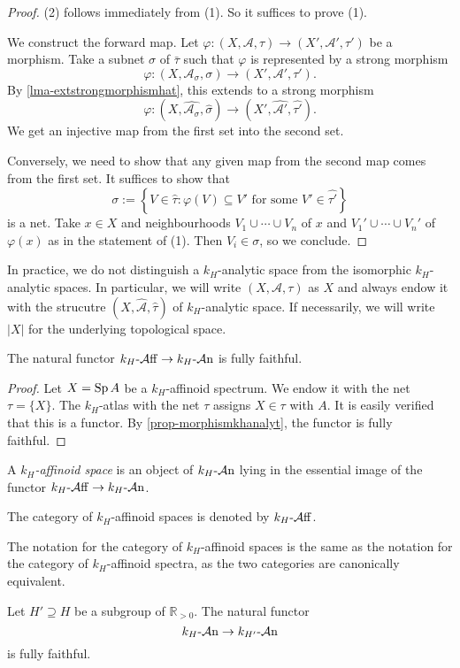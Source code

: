 \begin{proof}
    (2) follows immediately from (1). So it suffices to prove (1).

    We construct the forward map. Let $\varphi:(X,\mathcal{A},\tau)\rightarrow (X',\mathcal{A}',\tau')$ be a morphism. Take a subnet $\sigma$ of $\bar{\tau}$ such that $\varphi$ is represented by a strong morphism
    \[
        \varphi:(X,\mathcal{A}_{\sigma},\sigma)\rightarrow (X',\mathcal{A}',\tau').
    \]  
    By \cref{lma-extstrongmorphismhat}, this extends to a strong morphism
    \[
        \varphi:(X,\widehat{\mathcal{A}_{\sigma}},\hat{\sigma})\rightarrow (X',\widehat{\mathcal{A}'},\widehat{\tau'}).
    \] 
    We get an injective map from the first set into the second set.

    Conversely, we need to show that any given map from the second map comes from the first set. It suffices to show that
    \[
        \sigma:=\left\{ V\in \hat{\tau} : \varphi(V)\subseteq V'\text{ for some } V'\in \widehat{\tau'} \right\}
    \]
    is a net. Take $x\in X$ and neighbourhoods $V_1\cup\cdots\cup V_n$ of $x$ and $V_1'\cup\cdots\cup V_n'$ of $\varphi(x)$ as in the statement of (1). Then $V_i\in \sigma$, so we conclude. 
\end{proof}

In practice, we do not distinguish a $k_H$-analytic space from the isomorphic $k_H$-analytic spaces. In particular, we will write $(X,\mathcal{A},\tau)$ as $X$ and always endow it with the strucutre $(X,\hat{\mathcal{A}},\hat{\tau})$ of $k_H$-analytic space. If necessarily, we will write $|X|$ for the underlying topological space.

\begin{corollary}
    The natural functor $k_H\text{-}\mathcal{A}\mathrm{ff}\rightarrow k_H\text{-}\mathcal{A}\mathrm{n}$ is fully faithful.
\end{corollary}
\begin{proof}
    Let $X=\operatorname{Sp} A$ be a $k_H$-affinoid spectrum. We endow it with the net $\tau= \{X\}$. The $k_H$-atlas with the net $\tau$ assigns $X\in \tau$ with $A$. It is easily verified that this is a functor. By \cref{prop-morphismkhanalyt}, the functor is fully faithful.
\end{proof}

\begin{definition}
    A \emph{$k_H$-affinoid space} is an object of $k_H\text{-}\mathcal{A}\mathrm{n}$ lying in the essential image of the functor $k_H\text{-}\mathcal{A}\mathrm{ff}\rightarrow k_H\text{-}\mathcal{A}\mathrm{n}$.

    The category of $k_H$-affinoid spaces is denoted by $k_H\text{-}\mathcal{A}\mathrm{ff}$.
\end{definition}
The notation for the category of $k_H$-affinoid spaces is the same as the notation for the category of $k_H$-affinoid spectra, as the two categories are canonically equivalent.

\begin{thm}
    Let $H'\supseteq H$ be a subgroup of $\mathbb{R}_{>0}$. The natural functor
    \[
        k_H\text{-}\mathcal{A}\mathrm{n} \rightarrow k_{H'}\text{-}\mathcal{A}\mathrm{n}
    \]
    is fully faithful.
\end{thm}

\printbibliography
